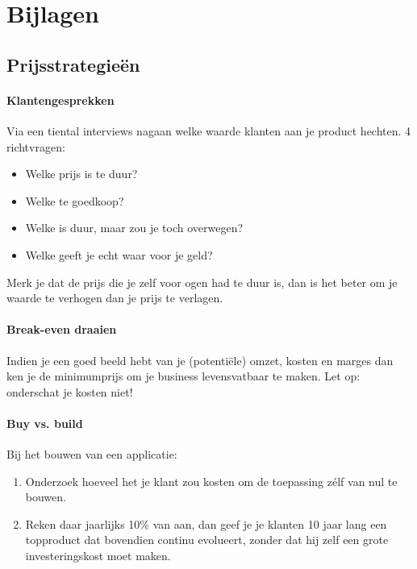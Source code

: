 

\section{Bijlagen} %
\label{sec:bijlagen}

\appendix

\renewcommand{\thesubsection}{\Alph{subsection}}

\subsection{Prijsstrategieën} %
\label{sub:prijsstrategieën}

\paragraph{Klantengesprekken}

Via een tiental interviews nagaan welke waarde klanten aan je product hechten. 4 richtvragen:

\begin{itemize}
  \item Welke prijs is te duur?
  \item Welke te goedkoop?
  \item Welke is duur, maar zou je toch overwegen?
  \item Welke geeft je echt waar voor je geld?
\end{itemize}

Merk je dat de prijs die je zelf voor ogen had te duur is, dan is het beter om je waarde te verhogen dan je prijs te verlagen.

\paragraph{Break-even draaien}

Indien je een goed beeld hebt van je (potentiële) omzet, kosten en marges dan ken je de minimumprijs om je business levensvatbaar te maken. Let op: onderschat je kosten niet!

\paragraph{Buy vs. build}

Bij het bouwen van een applicatie:
\begin{enumerate}
  \item Onderzoek hoeveel het je klant zou kosten om de toepassing zélf van nul te bouwen.
  \item Reken daar jaarlijks 10\% van aan, dan geef je je klanten 10 jaar lang een topproduct dat bovendien continu evolueert, zonder dat hij zelf een grote investeringskost moet maken.
\end{enumerate}


